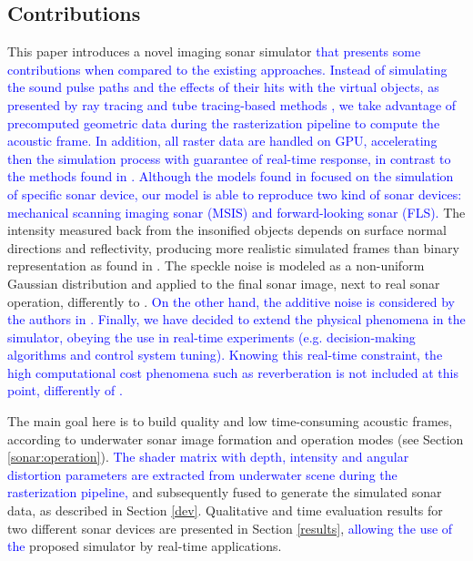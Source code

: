 \documentclass[final,5p,times]{elsarticle}
\begin{document}
\subsection{Contributions}

This paper introduces a novel imaging sonar simulator \textcolor{blue}{that presents some contributions when compared to the existing approaches. Instead of simulating the sound pulse paths and the effects of their hits with the virtual objects, as presented by ray tracing and tube tracing-based methods \cite{bell1997,coiras2009,sac2015,demarco2015,gu2013,kwak2015,gueriot2010},
we take advantage of precomputed geometric data during the rasterization
pipeline to compute the acoustic frame. In addition, all raster data are handled on GPU, accelerating then the simulation process with guarantee of
real-time response, in contrast to the methods found in
\cite{bell1997,coiras2009,sac2015,demarco2015}. Although the models found in \cite{bell1997,coiras2009,sac2015,demarco2015,gu2013,kwak2015,gueriot2010} focused on the simulation of specific sonar device, our model is able to reproduce two kind of sonar devices: mechanical scanning imaging sonar (MSIS)
and forward-looking sonar (FLS).} The intensity measured back from the
insonified objects depends on surface normal directions and reflectivity,
producing more realistic simulated frames than binary representation as
found in \cite{gu2013,kwak2015}. The speckle noise is modeled as a non-uniform Gaussian distribution and applied to the final sonar image, next to real sonar operation, differently to \cite{sac2015,demarco2015,gu2013,kwak2015,gueriot2010}. \textcolor{blue}{On the other hand, the additive noise is considered by the authors in \cite{sac2015,demarco2015}. Finally, we have decided to extend the physical phenomena in the simulator, obeying
the use in real-time experiments (e.g. decision-making algorithms and control system tuning). Knowing this real-time constraint, the high computational cost phenomena such as reverberation is not included at this point, differently of \cite{sac2015}.}

The main goal here is to build quality and low time\hyp{}consuming acoustic frames, according to underwater sonar image formation and operation modes (see Section \ref{sonar:operation}). \textcolor{blue}{The shader matrix with depth, intensity and angular distortion parameters are extracted from underwater scene during the rasterization pipeline,} and subsequently fused to generate the simulated sonar data, as described in Section \ref{dev}. Qualitative and time evaluation results for two different sonar devices are presented in Section \ref{results}, \textcolor{blue}{allowing the use of the} proposed simulator by real-time applications.
\end{document}
